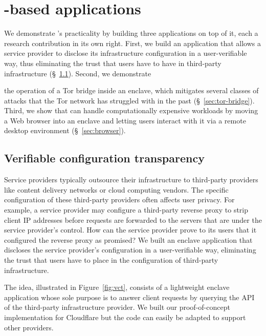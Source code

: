\section{\Tool{}-based applications}%
\label{sec:applications}

We demonstrate \tool{}'s practicality by building three applications on top of
it, each a research contribution in its own right.
%
First, we build an application that allows a service provider to disclose its
infrastructure configuration in a user-verifiable way, thus eliminating the
trust that users have to have in third-party infrastructure (\S~\ref{sec:vct}).
%
Second, we demonstrate 

the operation of a Tor bridge inside an enclave, which
mitigates several classes of attacks that the Tor network has struggled with in
the past (\S~\ref{sec:tor-bridge}).
%
Third, we show that \tool{} can handle computationally expensive workloads by
moving a Web browser into an enclave and letting users interact with it via a
remote desktop environment (\S~\ref{sec:browser}).

\subsection{Verifiable configuration transparency}%
\label{sec:vct}

Service providers typically outsource their infrastructure to third-party
providers like content delivery networks or cloud computing vendors.  The
specific configuration of these third-party providers often affects user
privacy.  For example, a service provider may configure a third-party reverse
proxy to strip client IP addresses before requests are forwarded to the servers
that are under the service provider's control.  How can the service provider
prove to its users that it configured the reverse proxy as promised?  We built
an enclave application that discloses the service provider's configuration in a
user-verifiable way, eliminating the trust that users have to place in the
configuration of third-party infrastructure.

The idea, illustrated in Figure~\ref{fig:vct}, consists of a lightweight
enclave application whose sole purpose is to answer client requests by querying
the API of the third-party infrastructure provider.  We built our
proof-of-concept implementation for Cloudflare but the code can easily be
adapted to support other providers.

